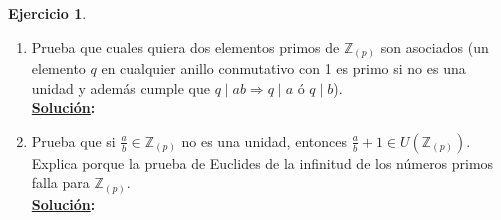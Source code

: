 \documentclass[11pt,letterpaper]{article}
\theoremstyle{definition}\newtheorem{p}{Ejercicio}
\theoremstyle{definition}\newtheorem{pp}[p]{$(*)$Ejercicio}
\numberwithin{p}{section}
\newcommand{\Z}{\mathbb{Z}}
\newcommand{\ent}{\Longrightarrow}
\newcommand{\sol}{\textbf{\underline{Solución}: }} %
\begin{document}
\begin{p}
\begin{enumerate}
  \item Prueba que cuales quiera dos elementos primos de $\Z_{(p)}$ son asociados (un elemento
    $q$ en cualquier anillo conmutativo con 1 es primo si no es una unidad y adem\'as cumple
    que $q\mid ab \ent q\mid a$ \'o $q\mid b$).\\
  \sol 
  
  \item Prueba que si $\frac{a}{b}\in\Z_{(p)}$ no es una unidad, entonces
    $\frac{a}{b}+1\in U(\Z_{(p)})$. Explica porque la prueba de Euclides de la infinitud de los
    n\'umeros primos falla para $\Z_{(p)}$.\\
  \sol 
  
  \end{enumerate}
  
\end{p}
\end{document}
